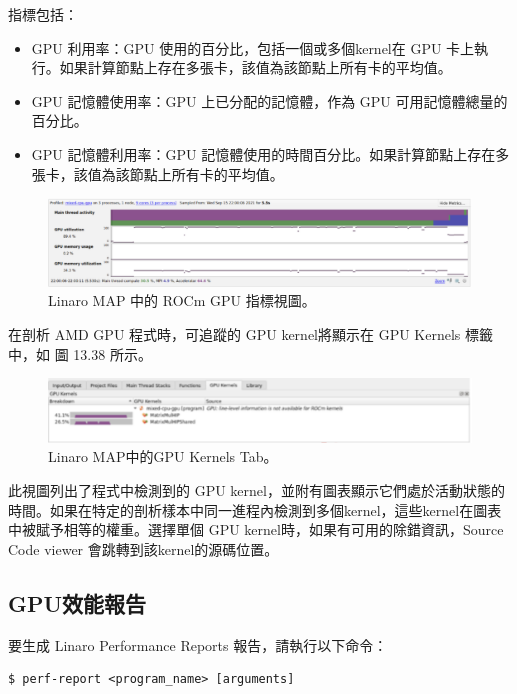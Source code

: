 指標包括：

\begin{itemize}
    \item GPU 利用率：GPU 使用的百分比，包括一個或多個kernel在 GPU 卡上執行。如果計算節點上存在多張卡，該值為該節點上所有卡的平均值。
    \item GPU 記憶體使用率：GPU 上已分配的記憶體，作為 GPU 可用記憶體總量的百分比。
    \item GPU 記憶體利用率：GPU 記憶體使用的時間百分比。如果計算節點上存在多張卡，該值為該節點上所有卡的平均值。
\end{itemize}

\begin{figure}
    \centering
    \includegraphics[width=0.9\linewidth]{FileAusiliari/Screenshots/Figure13-37.png}
    \caption{Linaro MAP 中的 ROCm GPU 指標視圖。}
    \label{fig:PAPI37}
\end{figure}

在剖析 AMD GPU 程式時，可追蹤的 GPU kernel將顯示在 GPU Kernels 標籤中，如 圖 13.38 所示。

\begin{figure}
    \centering
    \includegraphics[width=0.9\linewidth]{FileAusiliari/Screenshots/Figure13-38.png}
    \caption{Linaro MAP中的GPU Kernels Tab。}
    \label{fig:PAPI38}
\end{figure}

此視圖列出了程式中檢測到的 GPU kernel，並附有圖表顯示它們處於活動狀態的時間。如果在特定的剖析樣本中同一進程內檢測到多個kernel，這些kernel在圖表中被賦予相等的權重。選擇單個 GPU kernel時，如果有可用的除錯資訊，Source Code viewer 會跳轉到該kernel的源碼位置。

\subsection{GPU效能報告}

要生成 Linaro Performance Reports 報告，請執行以下命令：
\begin{lstlisting}
$ perf-report <program_name> [arguments]
\end{lstlisting}


